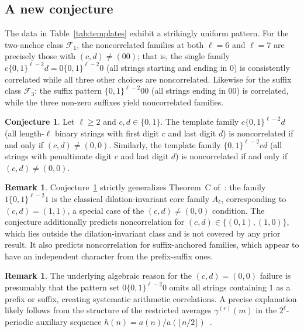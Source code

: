 \documentclass[11pt]{article}
\theoremstyle{definition}
\newtheorem{remark}[theorem]{Remark}
\newtheorem{conjecture}[theorem]{Conjecture}
\begin{document}
\subsection{A new conjecture}

The data in Table~\ref{tab:templates} exhibit a strikingly uniform
pattern. For the two-anchor class $\mathcal{F}_1$, the noncorrelated
families at both $\ell = 6$ and $\ell = 7$ are precisely those with
$(c, d) \neq (00)$; that is, the single family $c\{0,1\}^{\ell-2}d =
0\{0,1\}^{\ell-2}0$ (all strings starting and ending in $0$) is
consistently correlated while all three other choices are noncorrelated.
Likewise for the suffix class $\mathcal{F}_3$: the suffix pattern
$\{0,1\}^{\ell-2}00$ (all strings ending in $00$) is correlated,
while the three non-zero suffixes yield noncorrelated families.

\begin{conjecture}
\label{conj:boundary}
Let $\ell \geq 2$ and $c, d \in \{0,1\}$. The template family
$c\{0,1\}^{\ell-2}d$ (all length-$\ell$ binary strings with first
digit $c$ and last digit $d$) is noncorrelated if and only if
$(c,d) \neq (0,0)$. Similarly, the template family
$\{0,1\}^{\ell-2}cd$ (all strings with penultimate digit $c$ and
last digit $d$) is noncorrelated if and only if $(c,d) \neq (0,0)$.
\end{conjecture}

\begin{remark}
Conjecture~\ref{conj:boundary} strictly generalizes Theorem~C
of~\cite{Kon21}: the family $1\{0,1\}^{\ell-2}1$ is the classical
dilation-invariant core family $A_\ell$, corresponding to
$(c,d) = (1,1)$, a special case of the $(c,d) \neq (0,0)$ condition.
The conjecture additionally predicts noncorrelation for $(c,d) \in
\{(0,1),(1,0)\}$, which lies outside the dilation-invariant class and
is not covered by any prior result. It also predicts noncorrelation for
suffix-anchored families, which appear to have an independent character
from the prefix-suffix ones.
\end{remark}

\begin{remark}
The underlying algebraic reason for the $(c,d) = (0,0)$ failure is
presumably that the pattern set $0\{0,1\}^{\ell-2}0$ omits all strings
containing $1$ as a prefix or suffix, creating systematic arithmetic
correlations. A precise explanation likely follows from the structure of
the restricted averages $\gamma^{(r)}(m)$ in the $2^\ell$-periodic
auxiliary sequence $h(n) = a(n)/a(\lfloor n/2 \rfloor)$~\cite{Kon21}.
\end{remark}
\end{document}

